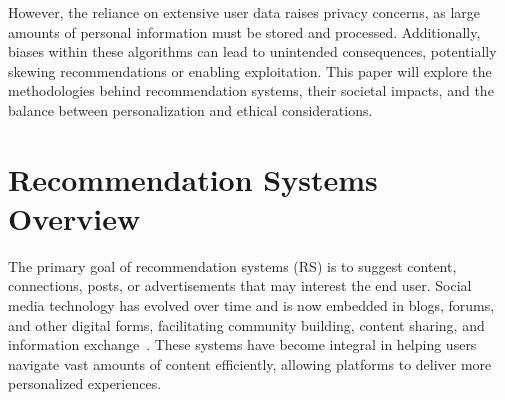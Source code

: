 \documentclass[10pt,twocolumn,twoside,a4paper]{article} %
\begin{document}
However, the reliance on extensive user data raises privacy concerns, as large amounts of personal information must
be stored and processed. Additionally, biases within these algorithms can lead to unintended consequences, potentially
skewing recommendations or enabling exploitation. This paper will explore the methodologies behind recommendation systems,
their societal impacts, and the balance between personalization and ethical considerations.

\section{Recommendation Systems Overview} \label{rec_sys_overview}
The primary goal of recommendation systems (RS) is to suggest content, connections, posts, or advertisements that may interest the end user. Social media technology has evolved over time and is now embedded in blogs, forums, and other digital forms, facilitating community building, content sharing, and information exchange~\cite{anandhan2018social}. These systems have become integral in helping users navigate vast amounts of content efficiently, allowing platforms to deliver more personalized experiences.
\end{document}
